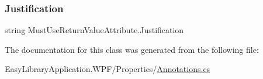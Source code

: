 \subsubsection{\texorpdfstring{Justification}{Justification}}
{\footnotesize\ttfamily string Must\+Use\+Return\+Value\+Attribute.\+Justification\hspace{0.3cm}{\ttfamily [get]}}



The documentation for this class was generated from the following file\+:\begin{DoxyCompactItemize}
\item 
Easy\+Library\+Application.\+W\+P\+F/\+Properties/\mbox{\hyperlink{_annotations_8cs}{Annotations.\+cs}}\end{DoxyCompactItemize}

